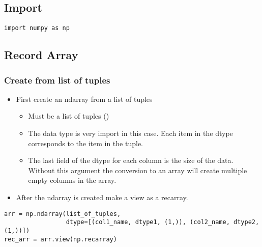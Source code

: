 \subsection{Import}
\begin{lstlisting}
import numpy as np
\end{lstlisting}

\subsection{Record Array}
%
\subsubsection{Create from list of tuples}
\begin{itemize}
  \item First create an ndarray from a list of tuples
    \begin{itemize}
      \item Must be a list of tuples
        ({\color{red}{list of lists will not work}})
      \item The data type is very import in this case. Each item in the dtype
        corresponds to the item in the tuple.
      \item The last field of the dtype for each column is the size of the data.
        Without this argument the conversion to an array will create multiple
        empty columns in the array.
    \end{itemize}
  \item After the ndarray is created make a view as a recarray.
\end{itemize}
\begin{lstlisting}[basicstyle=\bfseries\footnotesize]
arr = np.ndarray(list_of_tuples,
                 dtype=[(col1_name, dtype1, (1,)), (col2_name, dtype2, (1,))])
rec_arr = arr.view(np.recarray)
\end{lstlisting}
